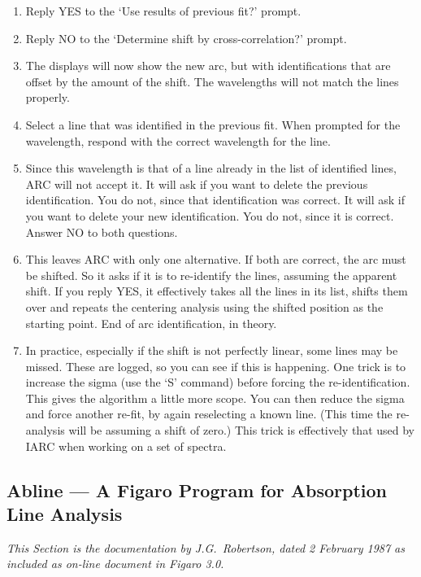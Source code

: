 \begin{enumerate}
\item Reply YES to the `Use results of previous fit?' prompt.
\item Reply NO to the `Determine shift by cross-correlation?' prompt.
\item The displays will now show the new arc, but with identifications
   that are offset by the amount of the shift.  The wavelengths will not
   match the lines properly.
\item Select a line that was identified in the previous fit.  When
   prompted for the wavelength, respond with the correct wavelength for
   the line.
\item Since this wavelength is that of a line already in the list of
   identified lines, ARC will not accept it.  It will ask if you want to
   delete the previous identification.  You do not, since that
   identification was correct.  It will ask if you want to delete your
   new identification.  You do not, since it is correct.  Answer NO to
   both questions.
\item This leaves ARC with only one alternative.  If both are correct,
   the arc must be shifted.  So it asks if it is to re-identify the
   lines, assuming the apparent shift.  If you reply YES, it effectively
   takes all the lines in its list, shifts them over and repeats the
   centering analysis using the shifted position as the starting point.
   End of arc identification, in theory.
\item In practice, especially if the shift is not perfectly linear, some
   lines may be missed.  These are logged, so you can see if this is
   happening.  One trick is to increase the sigma (use the `S' command)
   before forcing the re-identification.  This gives the algorithm a
   little more scope.  You can then reduce the sigma and force another
   re-fit, by again reselecting a known line.  (This time the
   re-analysis will be assuming a shift of zero.)  This trick is
   effectively that used by IARC when working on a set of spectra.
\end{enumerate}


\subsection{Abline --- A Figaro Program for Absorption Line Analysis}

{\it This Section is the documentation by J.G.\ Robertson, dated 2 February
1987 as included as on-line document in Figaro 3.0.}


